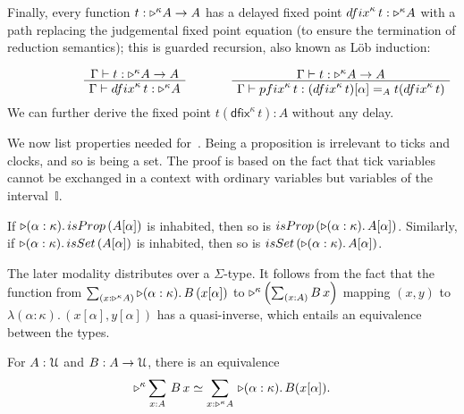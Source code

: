 \documentclass[a4paper,UKenglish,numberwithinsect,cleveref,thm-restate,draft]{lipics-v2021}
\numberwithin{equation}{section}
\theoremstyle{definition}
\theoremstyle{plain}
\begin{document}
  Finally, every function $t : \mathord{\triangleright}^\kappa A \to A$ has a delayed fixed point $\mathsf{dfix}^\kappa\,t : \laterp^\kappa A$ with a path replacing the judgemental fixed point equation (to ensure the termination of reduction semantics); this is guarded recursion, also known as Löb induction:
\[
  \begin{minipage}{0.47\linewidth}
    \begin{prooftree}
      \AxiomC{$\Gamma \vdash t : \laterp^\kappa A \to A$}
      \UnaryInfC{$\Gamma \vdash \mathsf{dfix}^\kappa\,t : \laterp^\kappa A$}
    \end{prooftree}
  \end{minipage}
  \begin{minipage}{0.47\linewidth}
    \begin{prooftree}
      \AxiomC{$\Gamma \vdash t : \laterp^\kappa A \to A$}
      \UnaryInfC{$\Gamma \vdash \mathsf{pfix}^\kappa\,t : (\mathsf{dfix}^\kappa\,t)[\alpha] =_A t(\mathsf{dfix}^\kappa\,t)$}
    \end{prooftree}
  \end{minipage}
\]
We can further derive the fixed point $t(\mathsf{dfix}^\kappa\,t) : A$ without any delay.

We now list properties needed for~.
Being a proposition is irrelevant to ticks and clocks, and so is being a set.
The proof is based on the fact that tick variables cannot be exchanged in a context with ordinary variables but variables of the interval~$\mathbb{I}$.
\begin{lemma}
  If $\laterp (\alpha : \kappa).\, \mathsf{isProp}\,(A [\alpha])$ is inhabited, then so is $\mathsf{isProp}\,(\laterp(\alpha: \kappa).\, A [\alpha])$. 
  Similarly, if $\laterp (\alpha : \kappa).\, \mathsf{isSet}\,(A [\alpha])$ is inhabited, then so is $\mathsf{isSet}\,(\laterp(\alpha: \kappa).\, A [\alpha])$. 
\end{lemma}

The later modality distributes over a $\Sigma$-type.
It follows from the fact that the function from $\sm{x : \laterp^\kappa A} \laterp (\alpha : \kappa).\, B\,(x[\alpha])$ to $\laterp^\kappa \left(\sm{x : A} B\,x\right)$ mapping $(x, y)$ to $\lambda (\alpha : \kappa).\, (x[\alpha], y[\alpha])$ has a quasi-inverse, which entails an equivalence between the types.%
\begin{lemma}\label{lem:later-sum}
  For $A : \mathcal{U}$ and $B : A \to \mathcal{U}$, there is an equivalence
  \begin{equation}\label{eq:later-sum}
    \eqv{\laterp^\kappa \sm{x : A} B\,x}{\sm{x : \laterp^\kappa A} \laterp (\alpha : \kappa).\, B (x [\alpha])}.
  \end{equation}
\end{lemma}
\end{document}
